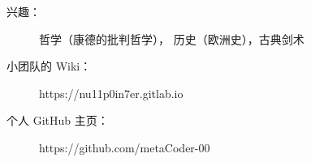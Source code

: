   \begin{description}
    \item[兴趣：] 哲学（康德的批判哲学）， 历史（欧洲史），古典剑术
    \item[小团队的 Wiki：] https://nu11p0in7er.gitlab.io
    \item[个人 GitHub 主页：] https://github.com/metaCoder-00
  \end{description}